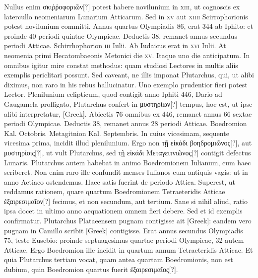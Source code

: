 Nullus enim \textgreek{σκιῤῥοφοριῶν[?]}
 potest habere novilunium in
\textsc{xiii}, ut cognoscis ex latercullo neomeniarum Lunarium Atticarum.
Sed in \textsc{xv} aut \textsc{xiiii} Scirrophorionis potest
 novilunium committi.
Annus quartus Olympiadis 86, erat 344 ab Iphito: et proinde
40 periodi quintae Olympicae.
Deductis 38, remanet annus
secundus periodi Atticae.
Schirrhophorion \textsc{iii} Iulii.
Ab Iudaicus
erat in \textsc{xvi} Iulii.
At neomenia primi Hecatombaeonis Metonici
die \textsc{xv}.
Itaque uno die anticipatum.
In omnibus igitur mire constat
methodus: quam studiosi Lectores in multis aliis exemplis periclitari
possunt.
Sed caveant, ne illis imponat Plutarchus, qui, ut alibi
diximus, non raro in his rebus hallucinatur.
Uno exemplo prudentior
fieri potest Lector.
Plenilunium eclipticum, quod contigit anno
Iphiti 446, Dario ad Gaugamela profligato, Plutarchus confert
in \textgreek{μυστηρίων[?]} tempus, hoc est, ut ipse alibi interpretatur,
 \textgreek{[Greek]}.
Abiectis 76 omnibus ex 446, remanet annus 66
sextae periodi Olympicae.
Deductis 38, remanet annus 28 periodi Atticae.
Boedromion Kal. Octobris.
Metagitnion Kal. Septembris.
In cuius
vicesimam, sequente vicesima prima, incidit illud plenilunium.
Ergo non \textgreek{τῇ εἰκάδι βοηδρομιῶνος[?]},
 aut \textgreek{μυστηρίοις[?]},
 ut vult Plutarchus, sed \textgreek{τῇ εἰκάδι Μεταγειτνιῶνος[?]}
contigit defectus Lunaris.
Plutarchus autem habebat
in animo Boedromionem Iulianum, cum haec scriberet.
Non
enim raro ille confundit menses Iulianos cum antiquis vagis: ut in anno
Actiaco ostendemus.
Haec satis fuerint de periodo Attica.
Superest,
ut reddamus rationem, quare quartum Boedromionem Tetraeteridis
Atticae \textgreek{ἐξαιρεσιμαῖον[?]} fecimus, et non secundum, aut tertium.
Sane si nihil aliud, ratio ipsa docet in ultimo anno aequationem
omnem fieri debere.
Sed et id exemplis confirmatur.
Plutarchus Plataeensem pugnam contigisse ait
 \textgreek{[Greek]}:
eandem vero pugnam in Camillo scribit \textgreek{[Greek]}
contigisse.
Erat annus secundus Olympiadis 75, teste
Eusebio: proinde septuagesimus quartae periodi Olympicae, 32
autem Atticae.
Ergo Boedromion ille incidit in quartum annum
Tetraeteridis Atticae.
Et quia Plutarchus tertiam vocat, quam
antea quartam Boedromionis, non est dubium, quin Boedromion
quartus fuerit \textgreek{ἐξαιρεσιμαῖος[?]}.

